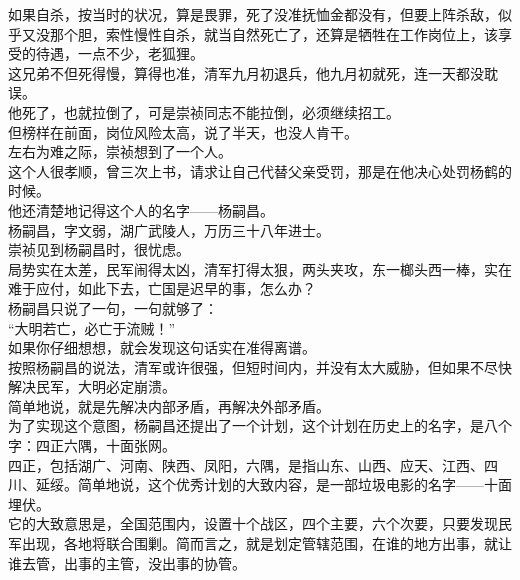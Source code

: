 \begin{multicols}{\theparacolNo}
如果自杀，按当时的状况，算是畏罪，死了没准抚恤金都没有，但要上阵杀敌，似乎又没那个胆，索性慢性自杀，就当自然死亡了，还算是牺牲在工作岗位上，该享受的待遇，一点不少，老狐狸。\\

这兄弟不但死得慢，算得也准，清军九月初退兵，他九月初就死，连一天都没耽误。\\

他死了，也就拉倒了，可是崇祯同志不能拉倒，必须继续招工。\\

但榜样在前面，岗位风险太高，说了半天，也没人肯干。\\

左右为难之际，崇祯想到了一个人。\\

这个人很孝顺，曾三次上书，请求让自己代替父亲受罚，那是在他决心处罚杨鹤的时候。\\

他还清楚地记得这个人的名字——杨嗣昌。\\

杨嗣昌，字文弱，湖广武陵人，万历三十八年进士。\\

崇祯见到杨嗣昌时，很忧虑。\\

局势实在太差，民军闹得太凶，清军打得太狠，两头夹攻，东一榔头西一棒，实在难于应付，如此下去，亡国是迟早的事，怎么办？\\

杨嗣昌只说了一句，一句就够了：\\

“大明若亡，必亡于流贼！”\\

如果你仔细想想，就会发现这句话实在准得离谱。\\

按照杨嗣昌的说法，清军或许很强，但短时间内，并没有太大威胁，但如果不尽快解决民军，大明必定崩溃。\\

简单地说，就是先解决内部矛盾，再解决外部矛盾。\\

为了实现这个意图，杨嗣昌还提出了一个计划，这个计划在历史上的名字，是八个字：四正六隅，十面张网。\\

四正，包括湖广、河南、陕西、凤阳，六隅，是指山东、山西、应天、江西、四川、延绥。简单地说，这个优秀计划的大致内容，是一部垃圾电影的名字——十面埋伏。\\

它的大致意思是，全国范围内，设置十个战区，四个主要，六个次要，只要发现民军出现，各地将联合围剿。简而言之，就是划定管辖范围，在谁的地方出事，就让谁去管，出事的主管，没出事的协管。\\


\end{multicols}

